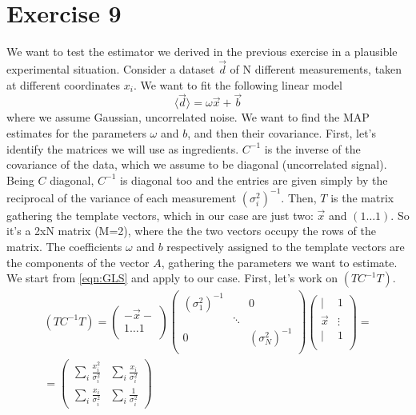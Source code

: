 \documentclass[a4paper,11pt,fleqn]{article}
\begin{document}
\section{Exercise 9}
We want to test the estimator we derived in the previous exercise in a
plausible experimental situation. Consider a dataset $\vec{d}$ of N 
different measurements, taken at different coordinates $x_i$. We want to 
fit the following linear model 
\begin{equation}
    \langle \vec{d}\rangle = \omega \vec{x} + \vec{b}
\end{equation}
where we assume Gaussian, uncorrelated noise. We want to find the MAP 
estimates for the parameters $\omega$ and $b$, and then their covariance. 
First, let's identify the matrices we will use as ingredients. $C^{-1}$ is 
the inverse of the covariance of the data, which we assume to be diagonal 
(uncorrelated signal). Being $C$ diagonal, $C^{-1}$ is diagonal too and the 
entries are given simply by the reciprocal of the variance of each 
measurement $(\sigma_i^2)^{-1}$. Then, $T$ is the matrix 
gathering the template vectors, which in our case are just two: $\vec{x}$ and 
$(1\dotsc1)$. So it's a 2xN matrix (M=2), where the the two vectors occupy 
the rows of the matrix. The coefficients $\omega$ and $b$ respectively assigned to the 
template vectors are the components of the vector $A$, gathering the 
parameters we want to estimate. 
We start from \ref{eqn:GLS} and apply to our case. First, let's work on 
$(TC^{-1}T)$.
\begin{gather*}
    (TC^{-1}T) = 
    \begin{pmatrix}
        -\vec{x}- \\
        1 \dotsc 1 \\
    \end{pmatrix}
    \begin{pmatrix}
        (\sigma_1^2)^{-1} &  & 0\\
        & \ddots & \\
        0 & & (\sigma_N^2)^{-1} \\
    \end{pmatrix}
    \begin{pmatrix}
        | & 1 \\
        \vec{x} & \vdots \\
        | & 1 \\
    \end{pmatrix}
    = \\ = 
    \begin{pmatrix}
        \sum_i \frac{x_i^2}{\sigma_i^2} & \sum_i \frac{x_i}{\sigma_i^2} \\
        \sum_i \frac{x_i}{\sigma_i^2} & \sum_i \frac{1}{\sigma_i^2}
    \end{pmatrix}
\end{gather*}
\end{document}
